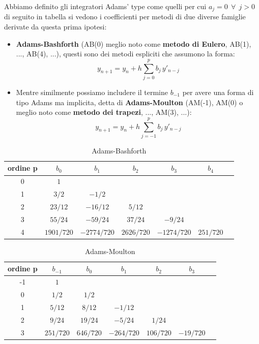 \documentclass{article}
\begin{document}
	Abbiamo definito gli integratori Adams' type come quelli per cui $a_j=0\ \ \forall\ \ j>0$ di seguito in tabella si vedono i coefficienti per metodi di due diverse famiglie derivate da questa prima ipotesi:
	\begin{itemize}
		\item \textbf{Adams-Bashforth} (AB(0) meglio noto come \textbf{metodo di Eulero}, AB(1), ..., AB(4), ...), questi sono dei metodi espliciti che assumono la forma:
		\begin{equation}\label{eq:Adams-Bashforth}
			\boxed{y_{n+1} = y_n + h \sum_{j=0}^p b_j\, y'_{n-j}}
		\end{equation}
		\item Mentre similmente possiamo includere il termine $b_{-1}$ per avere una forma di tipo Adams ma implicita, detta di \textbf{Adams-Moulton} (AM(-1), AM(0) o meglio noto come \textbf{metodo dei trapezi}, ..., AM(3), ...):
		\begin{equation}\label{eq:Adams-Moulton}
			\boxed{y_{n+1} = y_n + h \sum_{j=-1}^p b_j\, y'_{n-j}}
		\end{equation}
	\end{itemize}
	
	\begin{table}[H]
		\centering
		\begin{tabular}{c|cccccc}
			ordine p & $b_0$ & $b_1$ & $b_2$ & $b_3$ & $b_4$ \\ \hline
			0 & $1$ \\ 
			1 & $3/2$ & $-1/2$ \\
			2 & $23/12$ & $-16/12$ & $5/12$ \\
			3 & $55/24$ & $-59/24$ & $37/24$ & $-9/24$ \\
			4 & $1901/720$ & $-2774/720$ & $2626/720$ & $-1274/720$ & $251/720$\\
		\end{tabular}
		\caption{Adams-Bashforth}
		\label{tab:Adams-Bashforth coefficients}
	\end{table}
	
	\begin{table}[H]
		\centering
		\begin{tabular}{c|cccccc}
			ordine p & $b_{-1}$ & $b_0$ & $b_1$ & $b_2$ & $b_3$ \\ \hline
			-1 & $1$ \\
			0 & $1/2$ & $1/2$ \\
			1 & $5/12$ & $8/12$ & $-1/12$ \\
			2 & $9/24$ & $19/24$ & $-5/24$ & $1/24$ \\
			3 & $251/720$ & $646/720$ & $-264/720$ & $106/720$ & $-19/720$
		\end{tabular}
		\caption{Adams-Moulton}
		\label{tab:Adams-Moulton coefficients}
	\end{table}
	
\end{document}
